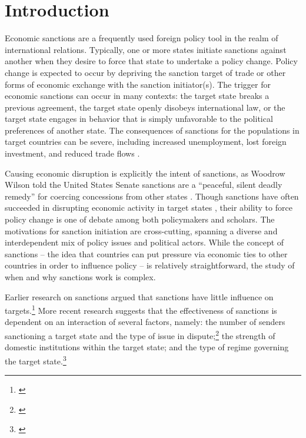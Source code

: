 \section*{Introduction}
\label{intro}

Economic sanctions are a frequently used foreign policy tool in the realm of international relations. Typically, one or more states initiate sanctions against another when they desire to force that state to undertake a policy change. Policy change is expected to occur by depriving the sanction target of trade or other forms of economic exchange with the sanction initiator(s). The trigger for economic sanctions can occur in many contexts: the target state breaks a previous agreement, the target state openly disobeys international law, or the target state engages in behavior that is simply unfavorable to the political preferences of another state. The consequences of sanctions for the populations in target countries can be severe, including increased unemployment, lost foreign investment, and reduced trade flows \citep{hufbauer2003impact,hufbauer1997us}. 

Causing economic disruption is explicitly the intent of sanctions, as Woodrow Wilson told the United States Senate sanctions are a ``peaceful, silent deadly remedy'' for coercing concessions from other states \citep{foley23}. Though sanctions have often succeeded in disrupting economic activity in target states \citep{escriba2010dealing}, their ability to force policy change is one of debate among both policymakers and scholars. The motivations for sanction initiation are cross-cutting, spanning a diverse and interdependent mix of policy issues and political actors. While the concept of sanctions -- the idea that countries can put pressure via economic ties to other countries in order to influence policy -- is relatively straightforward, the study of when and why sanctions work is complex.

Earlier research on sanctions argued that sanctions have little influence on targets.\footnote{\cite{lam1990, dashti1997, morgan1997, drezner1998}} More recent research suggests that the effectiveness of sanctions is dependent on an interaction of several factors, namely: the number of senders sanctioning a target state and the type of issue in dispute;\footnote{\cite{miers2002, morgan2009threat}} the strength of domestic institutions within the target state; and the type of regime governing the target state.\footnote{\cite{mcgillivray2004}} 


